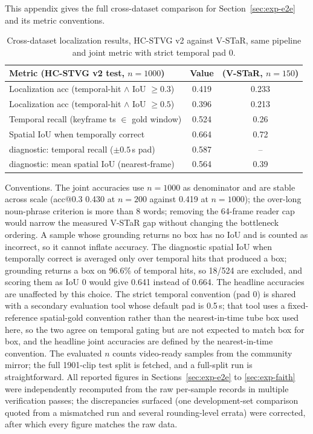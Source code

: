 \documentclass[10pt]{article}
\begin{document}
This appendix gives the full cross-dataset comparison for Section~\ref{sec:exp-e2e} and its metric conventions.

\begin{table}[htbp]
\centering
\small
\begin{tabular}{lcc}
\toprule
Metric (HC-STVG v2 test, $n=1000$) & Value & (V-STaR, $n=150$) \\
\midrule
Localization acc (temporal-hit $\wedge$ IoU $\ge 0.3$) & 0.419 & 0.233 \\
Localization acc (temporal-hit $\wedge$ IoU $\ge 0.5$) & 0.396 & 0.213 \\
Temporal recall (keyframe ts $\in$ gold window) & 0.524 & 0.26 \\
Spatial IoU when temporally correct & 0.664 & 0.72 \\
diagnostic: temporal recall ($\pm 0.5$\,s pad) & 0.587 & -- \\
diagnostic: mean spatial IoU (nearest-frame) & 0.564 & 0.39 \\
\bottomrule
\end{tabular}
\caption{Cross-dataset localization results, HC-STVG v2 against V-STaR, same pipeline and joint metric with strict temporal pad 0.}
\label{tab:cross}
\end{table}

Conventions. The joint accuracies use $n=1000$ as denominator and are stable across scale (acc@0.3 0.430 at $n=200$ against 0.419 at $n=1000$); the over-long noun-phrase criterion is more than 8 words; removing the 64-frame reader cap would narrow the measured V-STaR gap without changing the bottleneck ordering. A sample whose grounding returns no box has no IoU and is counted as incorrect, so it cannot inflate accuracy. The diagnostic spatial IoU when temporally correct is averaged only over temporal hits that produced a box; grounding returns a box on 96.6\% of temporal hits, so 18/524 are excluded, and scoring them as IoU 0 would give 0.641 instead of 0.664. The headline accuracies are unaffected by this choice. The strict temporal convention (pad 0) is shared with a secondary evaluation tool whose default pad is 0.5\,s; that tool uses a fixed-reference spatial-gold convention rather than the nearest-in-time tube box used here, so the two agree on temporal gating but are not expected to match box for box, and the headline joint accuracies are defined by the nearest-in-time convention. The evaluated $n$ counts video-ready samples from the community mirror; the full 1901-clip test split is fetched, and a full-split run is straightforward. All reported figures in Sections~\ref{sec:exp-e2e} to \ref{sec:exp-faith} were independently recomputed from the raw per-sample records in multiple verification passes; the discrepancies surfaced (one development-set comparison quoted from a mismatched run and several rounding-level errata) were corrected, after which every figure matches the raw data.
\end{document}
